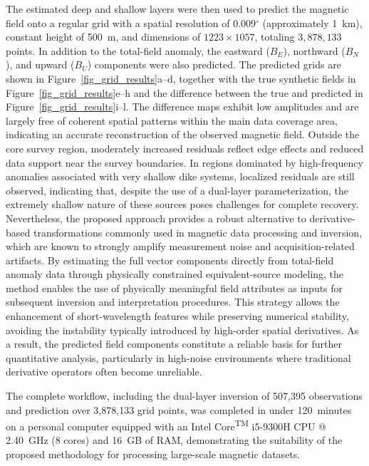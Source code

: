 \documentclass[a4paper,oneside,10pt]{book}
\begin{document}
The estimated deep and shallow layers were then used to predict the magnetic field
onto a regular grid with a spatial resolution of 0.009$^\circ$ (approximately
1~km), constant height of
500~m, and dimensions of $1223 \times 1057$, totaling $3,878,133$ points. In
addition to the total-field anomaly, the eastward ($B_E$), northward ($B_N$),
and upward ($B_U$) components were also predicted.
The predicted grids are shown in Figure~\ref{fig_grid_results}a--d, together
with the true synthetic fields in Figure~\ref{fig_grid_results}e--h and the
difference between the true and predicted in Figure~\ref{fig_grid_results}i--l.
The difference maps exhibit low amplitudes and are largely free of coherent
spatial patterns within the main data coverage area, indicating an accurate
reconstruction of the observed magnetic field. Outside the core survey
region, moderately increased residuals reflect edge effects and reduced data
support near the survey boundaries. In regions dominated by high-frequency
anomalies associated with very shallow dike systems, localized residuals are
still observed, indicating that, despite the use of a dual-layer
parameterization, the extremely shallow nature of these sources poses
challenges for complete recovery.
Nevertheless, the proposed approach provides a robust alternative to
derivative-based transformations commonly used in magnetic data processing
and inversion, which are known to strongly amplify measurement noise and
acquisition-related artifacts. By estimating the full vector components
directly from total-field anomaly data through physically constrained
equivalent-source modeling, the method enables the use of physically
meaningful field attributes as inputs for subsequent inversion and
interpretation procedures.
This strategy allows the enhancement of short-wavelength features while
preserving numerical stability, avoiding the instability typically
introduced by high-order spatial derivatives. As a result, the predicted
field components constitute a reliable basis for further quantitative
analysis, particularly in high-noise environments where traditional
derivative operators often become unreliable.

The complete workflow, including the dual-layer inversion of 507,395
observations and prediction over 3,878,133 grid points, was completed in under
120~minutes on a personal computer equipped with an
Intel\textsuperscript{\textregistered} Core\textsuperscript{TM} i5-9300H CPU @
2.40~GHz (8 cores) and 16~GB of RAM, demonstrating the suitability of the
proposed methodology for processing large-scale magnetic datasets.
\end{document}
